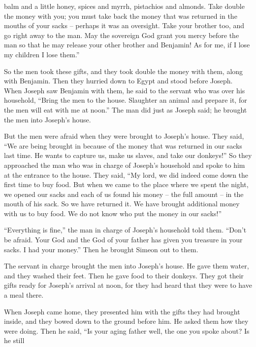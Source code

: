 {balm
and a little
honey,
spices
and myrrh,
pistachios
and almonds.
Take double
the money
with you; you must take
back
the money
that was returned
in the mouths
of your sacks
– perhaps
it was
an oversight.
Take
your brother
too, and go
right away
to
the man.
May the sovereign
God
grant
you mercy
before
the man
so that he may release
your other
brother
and Benjamin! As
for me, if I lose my children I
lose them.”
\par }{\PP {}So
the men
took
these
gifts,
and they took
double
the money
with them, along
with Benjamin.
Then
they hurried
down
to Egypt
and stood
before
Joseph.
When Joseph
saw
Benjamin
with
them, he said
to the servant who
was over
his household,
“Bring
the
men
to the house.
Slaughter
an animal
and prepare
it, for
the men
will eat
with
me at noon.”
The man
did
just
as Joseph
said;
he brought
the men
into Joseph’s
house.
\par }{\PP {}But the men
were afraid
when
they were brought
to Joseph’s
house.
They said,
“We
are being brought
in because
of the money
that was returned
in our sacks
last time.
He wants
to
capture
us, make
us slaves,
and take our donkeys!”
So they approached
the man
who
was in charge
of Joseph’s
household
and spoke
to
him at the entrance
to the house.
They said,
“My lord,
we did indeed come down
the first time
to buy
food.
But when
we
came
to
the place where we spent
the night, we opened
our sacks
and each
of us found his money
– the full amount –
in the mouth
of his sack.
So we have returned it.
We have brought additional
money
with us to buy
food.
We do not
know
who
put
the money
in our sacks!”
\par }{\PP {}“Everything is fine,”
the man in charge of Joseph’s household told
them. “Don’t
be afraid.
Your God
and the God
of your father
has given
you treasure
in your sacks.
I had your money.”
Then he brought
Simeon
out
to them.
\par }{\PP {}The servant in charge brought
the men
into Joseph’s
house.
He gave
them water,
and they washed
their feet.
Then he gave
food
to their donkeys.
They got their gifts
ready
for Joseph’s
arrival
at noon,
for
they had heard
that
they were to have a meal
there.
\par }{\PP {}When Joseph
came
home,
they presented
him with the gifts
they had
brought
inside,
and they bowed down
to the ground before him.
He asked
them how they were doing.
Then he said,
“Is your aging
father
well,
the one you spoke
about? Is he still
}
